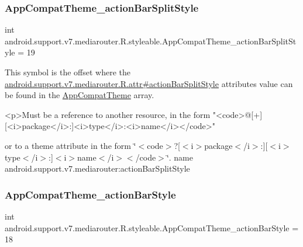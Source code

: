 \subsubsection{\texorpdfstring{App\+Compat\+Theme\+\_\+action\+Bar\+Split\+Style}{AppCompatTheme\_actionBarSplitStyle}}
{\footnotesize\ttfamily int android.\+support.\+v7.\+mediarouter.\+R.\+styleable.\+App\+Compat\+Theme\+\_\+action\+Bar\+Split\+Style = 19\hspace{0.3cm}{\ttfamily [static]}}

This symbol is the offset where the \hyperlink{classandroid_1_1support_1_1v7_1_1mediarouter_1_1R_1_1attr_a652ac3f04d2e8f20aeb339269b0aa8ea}{android.\+support.\+v7.\+mediarouter.\+R.\+attr\#action\+Bar\+Split\+Style} attribute\textquotesingle{}s value can be found in the \hyperlink{classandroid_1_1support_1_1v7_1_1mediarouter_1_1R_1_1styleable_a4e3d3900c75d49aeb2f283cac00214d6}{App\+Compat\+Theme} array.

\begin{DoxyVerb}      <p>Must be a reference to another resource, in the form "<code>@[+][<i>package</i>:]<i>type</i>:<i>name</i></code>"
\end{DoxyVerb}
 or to a theme attribute in the form \char`\"{}$<$code$>$?\mbox{[}$<$i$>$package$<$/i$>$\+:\mbox{]}\mbox{[}$<$i$>$type$<$/i$>$\+:\mbox{]}$<$i$>$name$<$/i$>$$<$/code$>$\char`\"{}.  name android.\+support.\+v7.\+mediarouter\+:action\+Bar\+Split\+Style \mbox{\label{classandroid_1_1support_1_1v7_1_1mediarouter_1_1R_1_1styleable_a24d210b595f7652ac59fe60ecb3e5550}} 
\subsubsection{\texorpdfstring{App\+Compat\+Theme\+\_\+action\+Bar\+Style}{AppCompatTheme\_actionBarStyle}}
{\footnotesize\ttfamily int android.\+support.\+v7.\+mediarouter.\+R.\+styleable.\+App\+Compat\+Theme\+\_\+action\+Bar\+Style = 18\hspace{0.3cm}{\ttfamily [static]}}

